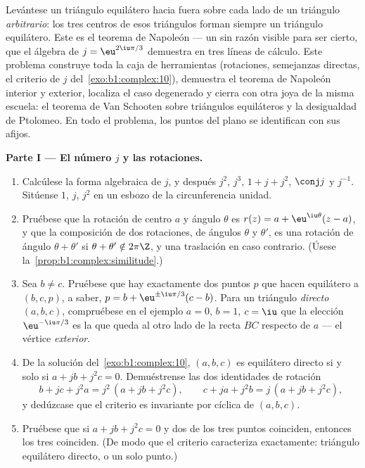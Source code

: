 \begin{problem}\label{pb:b1:complex:1}
Levántese un triángulo equilátero hacia fuera sobre cada lado de un
triángulo \emph{arbitrario}: los tres centros de esos triángulos forman
siempre un triángulo equilátero. Este es el teorema de
Napoleón --- un  sin razón visible
para ser cierto, que el álgebra de $j = \eu^{2\iu\pi/3}$ demuestra en
tres líneas de cálculo. Este problema construye toda la caja de
herramientas (rotaciones, semejanzas directas, el criterio de $j$
del~\cref{exo:b1:complex:10}), demuestra el teorema de Napoleón interior
y exterior, localiza el caso degenerado y cierra con otra joya de la
misma escuela: el teorema de Van Schooten sobre triángulos equiláteros
y la desigualdad de Ptolomeo. En todo el problema, los puntos del plano
se identifican con sus afijos.

\medskip
\noindent\textbf{Parte I --- El número $j$ y las rotaciones.}
\begin{enumerate}
  \item Calcúlese la forma algebraica de $j$, y después $j^2$, $j^3$,
        $1 + j + j^2$, $\conj j$ y $j^{-1}$. Sitúense $1$, $j$, $j^2$
        en un esbozo de la circunferencia unidad.
  \item Pruébese que la rotación de centro $a$ y ángulo $\theta$ es
        $r(z) = a + \eu^{\iu\theta}(z - a)$, y que la composición de
        dos rotaciones, de ángulos $\theta$ y $\theta'$, es una
        rotación de ángulo $\theta + \theta'$ si $\theta + \theta'
        \notin 2\pi\Z$, y una traslación en caso contrario. (Úsese
        la~\cref{prop:b1:complex:similitude}.)
  \item Sea $b \neq c$. Pruébese que hay exactamente dos puntos $p$
        que hacen equilátero a $(b, c, p)$, a saber, $p = b +
        \eu^{\pm\iu\pi/3}(c - b)$. Para un triángulo \emph{directo}
        $(a, b, c)$, compruébese en el ejemplo $a = 0$, $b = 1$, $c =
        \iu$ que la elección $\eu^{-\iu\pi/3}$ es la que queda al otro
        lado de la recta $BC$ respecto de $a$ --- el vértice
        \emph{exterior}.
  \item De la solución del~\cref{exo:b1:complex:10}, $(a, b, c)$ es
        equilátero directo si y solo si $a + jb + j^2c = 0$.
        Demuéstrense las dos identidades de rotación
        \[
        b + jc + j^2a = j^2\,(a + jb + j^2c),
        \qquad
        c + ja + j^2b = j\,(a + jb + j^2c),
        \]
        y dedúzcase que el criterio es invariante por 
        cíclica de $(a, b, c)$.
  \item Pruébese que si $a + jb + j^2c = 0$ y dos de los tres puntos
        coinciden, entonces los tres coinciden. (De modo que el
        criterio caracteriza exactamente: triángulo equilátero
        directo, o un solo punto.)
\end{enumerate}


\end{problem}
